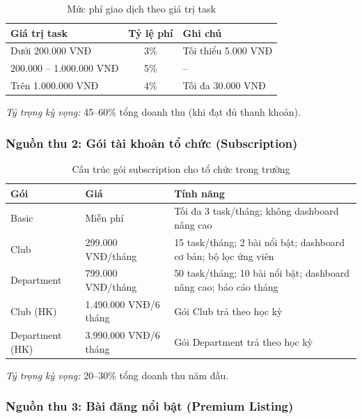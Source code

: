 \begin{table}[H]
\centering
\caption{Mức phí giao dịch theo giá trị task}
\begin{tabularx}{\textwidth}{|X|c|X|}
\hline
\textbf{Giá trị task} & \textbf{Tỷ lệ phí} & \textbf{Ghi chú} \\
\hline
Dưới 200.000 VNĐ     & 3\%   & Tối thiểu 5.000 VNĐ \\
\hline
200.000 -- 1.000.000 VNĐ & 5\% & -- \\
\hline
Trên 1.000.000 VNĐ   & 4\%   & Tối đa 30.000 VNĐ \\
\hline
\end{tabularx}
\end{table}

\textit{Tỷ trọng kỳ vọng:} 45--60\% tổng doanh thu (khi đạt đủ thanh khoản).

\subsubsection{Nguồn thu 2: Gói tài khoản tổ chức (Subscription)}

\begin{table}[htbp]
\centering
\caption{Cấu trúc gói subscription cho tổ chức trong trường}
\renewcommand{\arraystretch}{1.2}
\begin{tabularx}{\textwidth}{|p{3.5cm}|p{3.5cm}|X|}
\hline
\textbf{Gói} & \textbf{Giá} & \textbf{Tính năng} \\
\hline
Basic        & Miễn phí     & Tối đa 3 task/tháng; không dashboard nâng cao \\
\hline
Club         & 299.000 VNĐ/tháng & 15 task/tháng; 2 bài nổi bật; dashboard cơ bản; bộ lọc ứng viên \\
\hline
Department   & 799.000 VNĐ/tháng & 50 task/tháng; 10 bài nổi bật; dashboard nâng cao; báo cáo tháng \\
\hline
Club (HK)    & 1.490.000 VNĐ/6 tháng & Gói Club trả theo học kỳ \\
\hline
Department (HK) & 3.990.000 VNĐ/6 tháng & Gói Department trả theo học kỳ \\
\hline
\end{tabularx}
\end{table}

\textit{Tỷ trọng kỳ vọng:} 20--30\% tổng doanh thu năm đầu.

\subsubsection{Nguồn thu 3: Bài đăng nổi bật (Premium Listing)}

